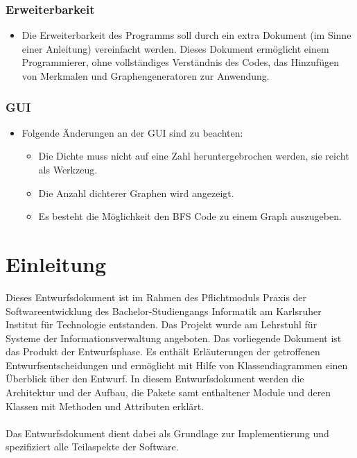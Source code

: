 \documentclass[13pt]{scrreprt}
\begin{document}
\subsection{Erweiterbarkeit}
    \begin{itemize} [label={}]
	\item Die Erweiterbarkeit des Programms soll durch ein extra Dokument (im Sinne einer Anleitung) vereinfacht werden.
	Dieses Dokument ermöglicht einem Programmierer, ohne vollständiges Verständnis des Codes, das Hinzufügen von Merkmalen und Graphengeneratoren zur Anwendung.
	\end{itemize}
	
\subsection{GUI}
	\begin{itemize} [label={}]
    \item Folgende Änderungen an der GUI sind zu beachten:
	\begin{itemize} [label={}]
	\item Die Dichte muss nicht auf eine Zahl heruntergebrochen werden, sie reicht als Werkzeug.
	\item Die Anzahl dichterer Graphen wird angezeigt.
	\item Es besteht die Möglichkeit den BFS Code zu einem Graph auszugeben.
	\end{itemize}
    \end{itemize}
    
\chapter{Einleitung}
Dieses Entwurfsdokument ist im Rahmen des Pflichtmoduls Praxis der Softwareentwicklung des Bachelor-Studiengangs Informatik am Karlsruher Institut für Technologie entstanden. Das Projekt wurde am Lehrstuhl für Systeme der Informationsverwaltung angeboten.
Das vorliegende Dokument ist das Produkt der Entwurfsphase. Es enthält Erläuterungen der getroffenen Entwurfsentscheidungen und ermöglicht mit Hilfe von Klassendiagrammen einen Überblick über den Entwurf.
In diesem Entwurfsdokument werden die Architektur und der Aufbau, die Pakete samt enthaltener Module und deren Klassen mit Methoden und Attributen erklärt.
\\ \\
Das Entwurfsdokument dient dabei als Grundlage zur Implementierung und spezifiziert alle Teilaspekte der Software.
\end{document}
